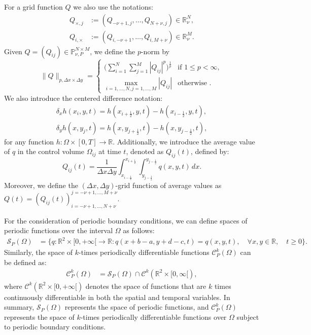 For a grid function $Q$ we also use the notations:
\begin{align*}
Q_{\times,j} &:= (Q_{-\nu+1,j}, \ldots, Q_{N+\nu,j}) \in \mathbb{R}^N_{\nu},\\
Q_{i,\times} &:= (Q_{i,-\nu+1}, \ldots, Q_{i,M+\nu}) \in \mathbb{R}^M_{\nu}.
\end{align*}
Given $Q = (Q_{ij})\in \mathbb{P}^{N \times M}_{\nu, P}$, we define the $p$-norm by
\begin{equation}
	\label{chp3-pnorm}
	\|Q\|_{p,\Delta x \times \Delta y}=
	\begin{cases}
		\bigg( \sum_{i=1}^{N} \sum_{j=1}^{M}|Q_{ij}|^p \bigg)^{\frac{1}{p}} & \text{if } 1\leq p < \infty,\\
		\max_{i=1, \ldots, N,j=1,\ldots,M}{|Q_{ij}|} & \text{otherwise }.
	\end{cases}
\end{equation}
We also introduce the centered difference notation:
\begin{align}
	\label{sec-adv2d:eq6}
	\delta_x {h}(x_i,y, t) = 
	{h}(x_{i+\frac{1}{2}}, y, t) - 
	{h}(x_{i-\frac{1}{2}}, y, t), \\
	\delta_y {h}(x, y_j,t) = 
    {h}(x, y_{j+\frac{1}{2}},t) - 
    {h}(x, y_{j-\frac{1}{2}},t),
\end{align}
for any function $h: \Omega \times [0,T] \to \mathbb{R}$.
Additionally, we introduce the average value of $q$ in the control volume
$\Omega_{ij}$ at time $t$, denoted as ${Q}_{ij}(t)$, defined by:
\begin{equation}
	\label{chp3-sec1-not2}
	{Q}_{ij}(t) = \frac{1}{\Delta x \Delta y}
	\int_{x_{i-\frac{1}{2}}}^{x_{i+\frac{1}{2}}} \int_{y_{j-\frac{1}{2}}}^{y_{j-\frac{1}{2}}} {q}(x,y,t) \,dx.
\end{equation}
Moreover, we define the $(\Delta x, \Delta y)$-grid function of average values as $Q(t) = (Q_{ij}(t))_{i=-\nu+1,\ldots,N+\nu}^{j=-\nu+1,\ldots,M+\nu}$.

For the consideration of periodic boundary conditions, we can define spaces of periodic functions over 
the interval $\Omega$ as follows:
\begin{align*}
	\mathcal{S}_P(\Omega) &= \{q:\mathbb{R}^2\times[0,+\infty[\to \mathbb{R}: q(x+b-a,y+d-c,t)=q(x,y,t), \quad \forall x,y \in \mathbb{R}, \quad t\geq0\}.
\end{align*}
Similarly, the space of $k$-times periodically differentiable functions $\mathcal{C}_P^k(\Omega)$ can be defined as:
\begin{align*}
	\mathcal{C}_P^k(\Omega) &= \mathcal{S}_P(\Omega) \cap \mathcal{C}^k(\mathbb{R}^2\times[0,\infty[),
\end{align*}
where $\mathcal{C}^k(\mathbb{R}^2\times[0,+\infty[)$ denotes the space of functions that are $k$ 
times continuously differentiable in both the spatial and temporal variables.
In summary, $\mathcal{S}_P(\Omega)$ represents the space of periodic functions, and $\mathcal{C}_P^k(\Omega)$
represents the space of $k$-times periodically differentiable functions over $\Omega$ subject to periodic boundary conditions.

